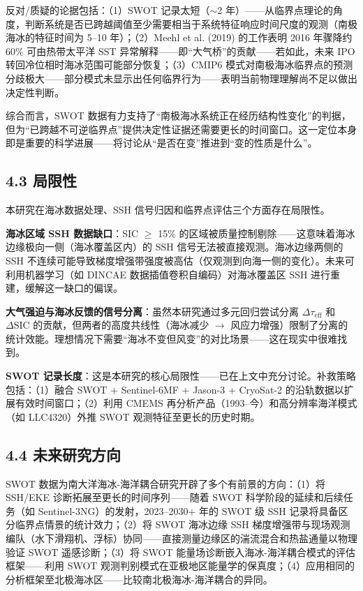 \documentclass[11pt,a4paper]{article}
\begin{document}
反对/质疑的论据包括：（1）SWOT 记录太短（$\sim$2 年）——从临界点理论的角度，判断系统是否已跨越阈值至少需要相当于系统特征响应时间尺度的观测（南极海冰的特征时间为 5--10 年）；（2）Meehl et al. (2019) 的工作表明 2016 年骤降约 60\% 可由热带太平洋 SST 异常解释——即``大气桥''的贡献——若如此，未来 IPO 转回冷位相时海冰范围可能部分恢复；（3）CMIP6 模式对南极海冰临界点的预测分歧极大——部分模式未显示出任何临界行为——表明当前物理理解尚不足以做出决定性判断。\par

综合而言，SWOT 数据有力支持了``南极海冰系统正在经历结构性变化''的判据，但为``已跨越不可逆临界点''提供决定性证据还需要更长的时间窗口。这一定位本身即是重要的科学进展——将讨论从``是否在变''推进到``变的性质是什么''。\par

\subsection*{4.3  局限性}

本研究在海冰数据处理、SSH 信号归因和临界点评估三个方面存在局限性。\par

\textbf{海冰区域 SSH 数据缺口}：SIC $\geq$ 15\% 的区域被质量控制剔除——这意味着海冰边缘极向一侧（海冰覆盖区内）的 SSH 信号无法被直接观测。海冰边缘两侧的 SSH 不连续可能导致梯度增强带强度被高估（仅观测到向海一侧的变化）。未来可利用机器学习（如 DINCAE 数据插值卷积自编码）对海冰覆盖区 SSH 进行重建，缓解这一缺口的偏误。\par

\textbf{大气强迫与海冰反馈的信号分离}：虽然本研究通过多元回归尝试分离 $\Delta\tau_{\text{eff}}$ 和 $\Delta\text{SIC}$ 的贡献，但两者的高度共线性（海冰减少 $\to$ 风应力增强）限制了分离的统计效能。理想情况下需要``海冰不变但风变''的对比场景——这在现实中很难找到。\par

\textbf{SWOT 记录长度}：这是本研究的核心局限性——已在上文中充分讨论。补救策略包括：（1）融合 SWOT + Sentinel-6MF + Jason-3 + CryoSat-2 的沿轨数据以扩展有效时间窗口；（2）利用 CMEMS 再分析产品（1993--今）和高分辨率海洋模式（如 LLC4320）外推 SWOT 观测特征至更长的历史时期。\par

\subsection*{4.4  未来研究方向}

SWOT 数据为南大洋海冰-海洋耦合研究开辟了多个有前景的方向：（1）将 SSH/EKE 诊断拓展至更长的时间序列——随着 SWOT 科学阶段的延续和后续任务（如 Sentinel-3NG）的发射，2023--2030+ 年的 SWOT 级 SSH 记录将具备区分临界点情景的统计效力；（2）将 SWOT 海冰边缘 SSH 梯度增强带与现场观测编队（水下滑翔机、浮标）协同——直接测量边缘区的湍流混合和热盐通量以物理验证 SWOT 遥感诊断；（3）将 SWOT 能量场诊断嵌入海冰-海洋耦合模式的评估框架——利用 SWOT 观测判别模式在亚极地区能量学的保真度；（4）应用相同的分析框架至北极海冰区——比较南北极海冰-海洋耦合的异同。\par
\end{document}
